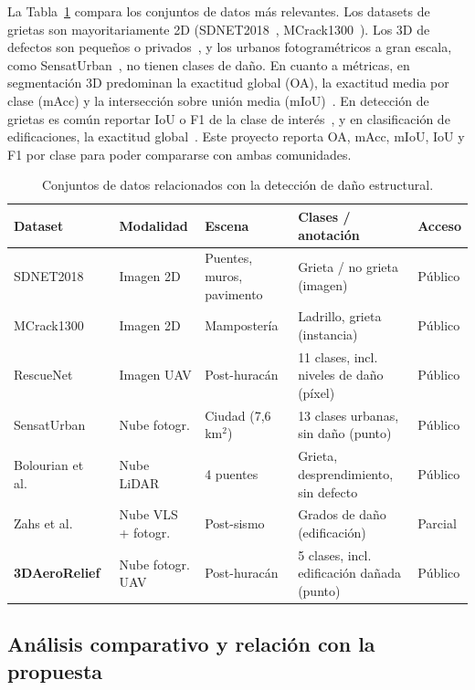 \documentclass[5p]{elsarticle}
\begin{document}
La Tabla~\ref{tab:datasets} compara los conjuntos de datos más relevantes. Los datasets de grietas son mayoritariamente 2D (SDNET2018~\cite{Dorafshan2018}, MCrack1300~\cite{Ye2024}). Los 3D de defectos son pequeños o privados~\cite{Bolourian2023,Liu2025}, y los urbanos fotogramétricos a gran escala, como SensatUrban~\cite{Hu2022}, no tienen clases de daño. En cuanto a métricas, en segmentación 3D predominan la exactitud global (OA), la exactitud media por clase (mAcc) y la intersección sobre unión media (mIoU)~\cite{Hu2022,Le2026,Wu2024}. En detección de grietas es común reportar IoU o F1 de la clase de interés~\cite{Liu2025,Fan2024}, y en clasificación de edificaciones, la exactitud global~\cite{Zahs2023}. Este proyecto reporta OA, mAcc, mIoU, IoU y F1 por clase para poder compararse con ambas comunidades.

\begin{table}[t]
\centering
\caption{Conjuntos de datos relacionados con la detección de daño estructural.}\label{tab:datasets}
\footnotesize
\begin{tabular}{@{}p{2.5cm}p{1.4cm}p{2.6cm}p{2.9cm}p{2.2cm}@{}}
\toprule
Dataset & Modalidad & Escena & Clases / anotación & Acceso \\
\midrule
SDNET2018~\cite{Dorafshan2018} & Imagen 2D & Puentes, muros, pavimento & Grieta / no grieta (imagen) & Público \\
MCrack1300~\cite{Ye2024} & Imagen 2D & Mampostería & Ladrillo, grieta (instancia) & Público \\
RescueNet~\cite{Rahnemoonfar2023} & Imagen UAV & Post-huracán & 11 clases, incl. niveles de daño (píxel) & Público \\
SensatUrban~\cite{Hu2022} & Nube fotogr. & Ciudad (7,6\,km$^2$) & 13 clases urbanas, sin daño (punto) & Público \\
Bolourian et al.~\cite{Bolourian2023} & Nube LiDAR & 4 puentes & Grieta, desprendimiento, sin defecto & Público \\
Zahs et al.~\cite{Zahs2023} & Nube VLS + fotogr. & Post-sismo & Grados de daño (edificación) & Parcial \\
\textbf{3DAeroRelief}~\cite{Le2026} & Nube fotogr. UAV & Post-huracán & 5 clases, incl. edificación dañada (punto) & Público \\
\bottomrule
\end{tabular}
\end{table}

\subsection{Análisis comparativo y relación con la propuesta}
\end{document}
